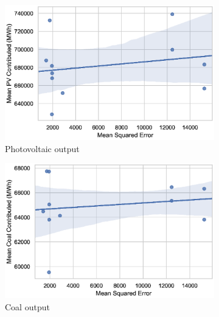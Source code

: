 \begin{figure}
	\centering
	\begin{subfigure}{0.3\textwidth}
		\includegraphics[width=\columnwidth]{Chapter5/figures/market-forecasting/results/elecsim_results/results_2/contributed_PV_mean_output}
		\caption{Photovoltaic output}
		\label{fig:contributed_PV_mean_output}
	\end{subfigure}
	\hfil
	\begin{subfigure}{0.3\textwidth}  
		\includegraphics[width=\columnwidth]{Chapter5/figures/market-forecasting/results/elecsim_results/results_2/contributed_Coal_mean_output.eps}
		\caption{Coal output}
		\label{fig:contributed_Coal_mean_output}
	\end{subfigure}
	\hfil
	\begin{subfigure}{0.3\textwidth}   

\end{subfigure}
\end{figure}

